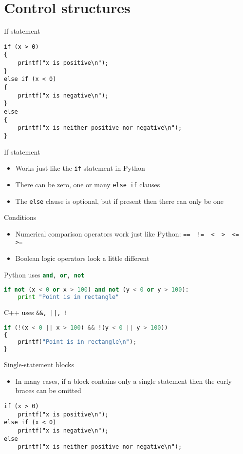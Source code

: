 \part{Control structures}
\frame{\partpage}

\begin{frame}[fragile]{If statement}
	\begin{lstlisting}
if (x > 0)
{
    printf("x is positive\n");
}
else if (x < 0)
{
    printf("x is negative\n");
}
else
{
    printf("x is neither positive nor negative\n");
}
	\end{lstlisting}
\end{frame}

\begin{frame}[fragile]{If statement}
    \begin{itemize}
        \item Works just like the \lstinline{if} statement in Python \pause
        \item There can be zero, one or many \lstinline{else if} clauses \pause
        \item The \lstinline{else} clause is optional, but if present then there can only be one
    \end{itemize}
\end{frame}

\begin{frame}[fragile]{Conditions}
    \begin{itemize}
        \item Numerical comparison operators work just like Python:
        \lstinline{==  !=  <  >  <=  >=}
        \pause
        \item Boolean logic operators look a little different
    \end{itemize}
    \pause
    Python uses \lstinline[language=Python]{and, or, not}
    \begin{lstlisting}[language=Python]
if not (x < 0 or x > 100) and not (y < 0 or y > 100):
    print "Point is in rectangle"
    \end{lstlisting}
    \pause
    C++ uses \lstinline{&&, ||, !}
    \begin{lstlisting}[language=Python]
if (!(x < 0 || x > 100) && !(y < 0 || y > 100))
{
    printf("Point is in rectangle\n");
}
    \end{lstlisting}
\end{frame}

\begin{frame}[fragile]{Single-statement blocks}
    \begin{itemize}
        \item In many cases, if a block contains only a single statement then the curly braces can be omitted
    \end{itemize}
    \begin{lstlisting}
if (x > 0)
    printf("x is positive\n");
else if (x < 0)
    printf("x is negative\n");
else
    printf("x is neither positive nor negative\n");
    \end{lstlisting}
\end{frame}

